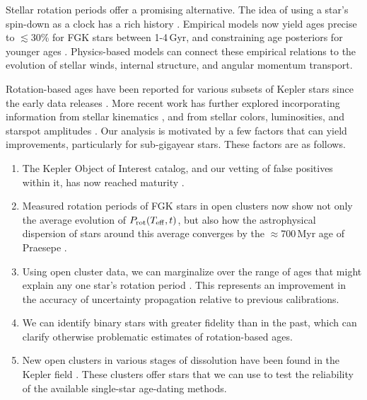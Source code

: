 \documentclass[11pt,twocolumn,tighten,linenumbers]{aastex63}
\begin{document}
Stellar rotation periods offer a promising alternative.  The idea of
using a star's spin-down as a clock has a rich history
\citep{Skumanich_1972,Noyes_1984,Kawaler_1989,Barnes03,Mamajek_2008,Angus_2015}.
Empirical models now yield ages precise to $\lesssim$30\% for FGK
stars between 1-4\,Gyr, and constraining age posteriors for younger
ages \citep{Bouma_2023}.  Physics-based models
\citep{Matt_2015,Gallet_Bouvier_2015,Spada_2020} can connect these
empirical relations to the evolution of stellar winds, internal
structure, and angular momentum transport.

Rotation-based ages have been reported for various subsets of Kepler
stars since the early data releases
\citep[e.g.][]{Walkowicz_2013,McQuillan_2014,Reinhold_2015,Angus_2018}.
More recent work has further explored incorporating information from
stellar kinematics \citep{2021AJ....161..189L,2024AJ....167..159L},
and from stellar colors, luminosities, and starspot amplitudes
\citep{2023ApJ...952..131M}.  Our analysis is motivated by a few
factors that can yield improvements, particularly for sub-gigayear
stars.   These factors are as follows.

\begin{enumerate}[label={\it \roman*)},leftmargin=12pt,topsep=0pt,itemsep=-1ex,partopsep=1ex,parsep=1ex]
  \item The Kepler Object of Interest catalog, and our vetting of
    false positives within it, has now reached maturity
    \citep[e.g.][]{Thompson_2018}.
  \item Measured rotation periods of FGK stars in open clusters now
    show not only the average evolution of $P_{\rm rot}(T_{\rm
    eff},t)$, but also how the astrophysical dispersion of stars
    around this average converges by the $\approx$700\,Myr age of
    Praesepe
    \citep[e.g.][]{Curtis_2019_ngc6811,Gillen_2020,Rampalli_2021,Fritzewski_2021,Rebull_2022,Dungee_2022,2023AJ....166...14B}.
  \item Using open cluster data, we can marginalize over the range of
    ages that might explain any one star's rotation period
    \citep{Bouma_2023}.  This represents an improvement in the
    accuracy of uncertainty propagation relative to previous
    calibrations.
  \item We can identify binary stars with greater fidelity than
    in the past, which can clarify otherwise problematic estimates of
    rotation-based ages.
  \item New open clusters in various stages of dissolution have been
    found in the Kepler field
    \cite[e.g.][]{2019AJ....158..122K,Kerr_2021,Barber_2022}.
    These clusters offer stars that we can use to test
    the reliability of the available single-star age-dating methods.
\end{enumerate}
\end{document}
